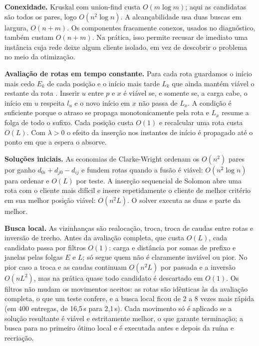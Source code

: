 \documentclass[12pt]{article}
\begin{document}
\textbf{Conexidade.} Kruskal com union-find \cite{kruskal1956} custa $O(m\log m)$; aqui as candidatas são todos os pares, logo $O(n^2\log n)$. A alcançabilidade usa duas buscas em largura, $O(n+m)$. Os componentes fracamente conexos, usados no diagnóstico, também custam $O(n+m)$. Na prática, isso permite recusar de imediato uma instância cuja rede deixe algum cliente isolado, em vez de descobrir o problema no meio da otimização.

\textbf{Avaliação de rotas em tempo constante.} Para cada rota guardamos o início mais cedo $E_k$ de cada posição e o início mais tarde $L_k$ que ainda mantém viável o restante da rota \cite{savelsbergh1985}. Inserir $u$ entre $p$ e $x$ é viável se, e somente se, a carga cabe, o início em $u$ respeita $l_u$ e o novo início em $x$ não passa de $L_x$. A condição é suficiente porque o atraso se propaga monotonicamente pela rota e $L_x$ resume a folga de todo o sufixo. Cada posição custa $O(1)$ e recalcular uma rota custa $O(L)$. Com $\lambda>0$ o efeito da inserção nos instantes de início é propagado até o ponto em que a espera o absorve.

\textbf{Soluções iniciais.} As economias de Clarke-Wright \cite{clarke1964} ordenam os $O(n^2)$ pares por ganho $d_{0i}+d_{j0}-d_{ij}$ e fundem rotas quando a fusão é viável: $O(n^2\log n)$ para ordenar e $O(L)$ por teste. A inserção sequencial de Solomon \cite{solomon1987} abre uma rota com o cliente mais difícil e insere repetidamente o cliente de melhor critério em sua melhor posição viável: $O(n^2L)$. O solver executa as duas e parte da melhor.

\textbf{Busca local.} As vizinhanças são realocação, troca, troca de caudas entre rotas e inversão de trecho. Antes da avaliação completa, que custa $O(L)$, cada candidato passa por filtros $O(1)$: carga e distância por somas de prefixo e janelas pelas folgas $E$ e $L$; só segue quem não é claramente inviável ou pior. No pior caso a troca e as caudas continuam $O(n^2L)$ por passada e a inversão $O(nL^2)$, mas na prática quase todo candidato é descartado em $O(1)$. Os filtros não mudam os movimentos aceitos: as rotas são idênticas às da avaliação completa, o que um teste confere, e a busca local ficou de 2 a 8 vezes mais rápida (em 400 entregas, de 16,5\,s para 2,1\,s). Cada movimento só é aplicado se a solução resultante é viável e estritamente melhor, o que garante terminação; a busca para no primeiro ótimo local e é executada antes e depois da ruína e recriação.
\end{document}
